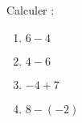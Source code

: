 
\begin{exercice}\label{exo2smath-0296}

    Calculer :
    \begin{multicols}{2}
        \begin{enumerate}
            \item
                \( 6-4\)
            \item
                \( 4-6\)
            \item
                \( -4+7\)
            \item
                \( 8-(-2)\)
        \end{enumerate}
    \end{multicols}

\end{exercice}
